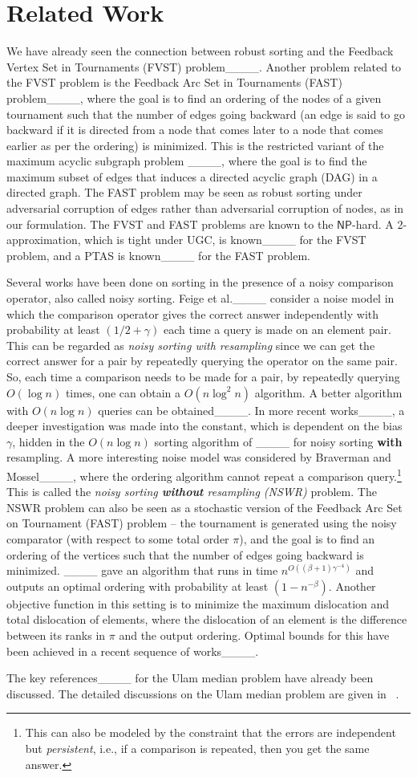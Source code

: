 \section{Related Work}
We have already seen the connection between robust sorting and the Feedback Vertex Set in Tournaments (FVST) problem____. Another problem related to the FVST problem is the Feedback Arc Set in Tournaments (FAST) problem____, where the goal is to find an ordering of the nodes of a given tournament such that the number of edges going backward (an edge is said to go backward if it is directed from a node that comes later to a node that comes earlier as per the ordering) is minimized. This is the restricted variant of the maximum acyclic subgraph problem ____, where the goal is to find the maximum subset of edges that induces a directed acyclic graph (DAG) in a directed graph. The FAST problem may be seen as robust sorting under adversarial corruption of edges rather than adversarial corruption of nodes, as in our formulation. The FVST and FAST problems are known to the $\mathsf{NP}$-hard. A 2-approximation, which is tight under UGC, is known____ for the FVST problem, and a PTAS is known____ for the FAST problem. 

Several works have been done on sorting in the presence of a noisy comparison operator, also called noisy sorting. Feige et al.____ consider a noise model in which the comparison operator gives the correct answer independently with probability at least $(1/2 + \gamma)$ each time a query is made on an element pair. This can be regarded as {\em noisy sorting with resampling} since we can get the correct answer for a pair by repeatedly querying the operator on the same pair. So, each time a comparison needs to be made for a pair, by repeatedly querying $O(\log{n})$ times, one can obtain a $O(n \log^2{n})$ algorithm. 
A better algorithm with $O(n \log{n})$ queries can be obtained____.
In more recent works____, a deeper investigation was made into the constant, which is dependent on the bias $\gamma$, hidden in the $O(n \log{n})$ sorting algorithm of ____ for noisy sorting {\bf with} resampling.
A more interesting noise model was considered by Braverman and Mossel____, where the ordering algorithm cannot repeat a comparison query.\footnote{This can also be modeled by the constraint that the errors are independent but {\em persistent}, i.e., if a comparison is repeated, then you get the same answer.}
This is called the {\em noisy sorting \textbf{without} resampling (NSWR)} problem. The NSWR problem can also be seen as a stochastic version of the Feedback Arc Set on Tournament (FAST) problem -- the tournament is generated using the noisy comparator (with respect to some total order $\pi$), and the goal is to find an ordering of the vertices such that the number of edges going backward is minimized. ____ gave an algorithm that runs in time $n^{O((\beta+1)\gamma^{-4})}$ and outputs an optimal ordering with probability at least $(1-n^{-\beta})$. Another objective function in this setting is to minimize the maximum dislocation and total dislocation of elements, where the dislocation of an element is the difference between its ranks in $\pi$ and the output ordering. 
Optimal bounds for this have been achieved in a recent sequence of works____.

The key references____ for the Ulam median problem have already been discussed. The detailed discussions on the Ulam median problem are given in ~.
